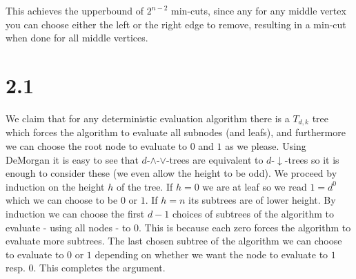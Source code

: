 This achieves the upperbound of $2^{n-2}$ min-cuts, since any for any middle vertex you can choose either the left or the right edge to remove, resulting in a min-cut when done for all middle vertices.

\section*{2.1}

We claim that for any deterministic evaluation algorithm there is a $T_{d,k}$ tree which forces the algorithm to evaluate all subnodes (and leafs), and furthermore we can choose the root node to evaluate to $0$ and $1$ as we please.
Using DeMorgan it is easy to see that $d$-$\land$-$\lor$-trees are equivalent to $d$-$\downarrow$-trees so it is enough to consider these (we even allow the height to be odd).
We proceed by induction on the height $h$ of the tree. 
If $h = 0$ we are at leaf so we read $1 = d^0$ which we can choose to be $0$ or $1$.
If $h = n$ its subtrees are of lower height. 
By induction we can choose the first $d-1$ choices of subtrees of the algorithm to evaluate - using all nodes - to 0.
This is because each zero forces the algorithm to evaluate more subtrees.
The last chosen subtree of the algorithm we can choose to evaluate to $0$ or $1$ depending on whether we want the node to evaluate to $1$ resp. $0$.
This completes the argument.


